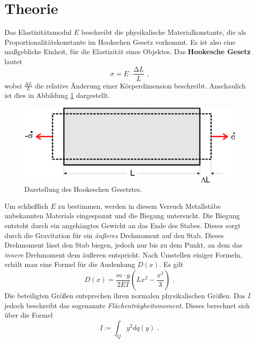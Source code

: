 \section{Theorie}
\label{sec:Theorie}

Das Elastizitätsmodul $E$ beschreibt die physikalische Materialkonstante,
die als Proportionalitätskonstante im Hookschen Gesetz vorkommt.
Es ist also eine maßgebliche Einheit, für die Elastizität eines Objektes.
Das \textbf{Hookesche Gesetz} lautet
\begin{equation}
        \sigma = E \cdot \frac {\increment L}{L} \text{ ,}
\end{equation}
wobei $\frac {\increment L}{L}$ die relative Änderung einer Körperdimension beschreibt.
Anschaulich ist dies in Abbildung \ref{fig:Hook1} dargestellt.

\begin{figure}[H]
        \centering
        \includegraphics[width=\textwidth]{pictures/Hook1.png}
        \caption{Darstellung des Hookeschen Gesetztes.}
        \label{fig:Hook1}
\end{figure}

Um schließlich $E$ zu bestimmen, werden in diesem Versuch Metallstäbe unbekannten Materials eingespannt und die Biegung untersucht.
Die Biegung entsteht durch ein angehängtes Gewicht an das Ende des Stabes.
Dieses sorgt durch die Gravitation für ein \textit{äußeres} Drehmoment auf den Stab.
Dieses Drehmoment lässt den Stab biegen, jedoch nur bis zu dem Punkt, an dem das \textit{innere} Drehmoment dem äußeren entspricht.
Nach Umstellen einiger Formeln, erhält man eine Formel für die Auslenkung $D(x)$.
Es gilt
\begin{equation} \label{eq:E1}
        D(x) = \frac{m \cdot g}{2 E I} (Lx^2 - \frac{x^3}{3}) \text{ .}
\end{equation}
Die beteiligten Größen entsprechen ihren normalen physikalischen Größen.
Das $I$ jedoch beschreibt das sogenannte \textit{Flächenträgheitsmoment}.
Dieses berechnet sich über die Formel
\begin{equation}
        I \coloneq \int_Q y^2 dq(y) \text{ .}
\end{equation}

